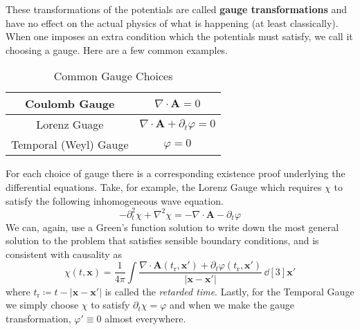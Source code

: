 These transformations of the potentials are called \textbf{gauge transformations}
and have no effect on the actual physics of what is happening (at least
classically). When one imposes an extra condition which the potentials must
satisfy, we call it choosing a gauge. Here are a few common examples.
\begin{table}[H]
    \centering
    \begin{tabular}{c c}
        Coulomb Gauge         & \(\nabla\cdot\mathbf{A} = 0\)                     \\ \midrule
        Lorenz Guage          & \(\nabla\cdot\mathbf{A} + \partial_t\varphi = 0\) \\ \midrule
        Temporal (Weyl) Gauge & \(\varphi = 0\)
    \end{tabular}
    \caption{Common Gauge Choices}\label{table:gauges}
\end{table}
For each choice of gauge there is a corresponding existence proof underlying the
differential equations. Take, for example, the Lorenz Gauge which requires
\(\chi\) to satisfy the following inhomogeneous wave equation.
\begin{equation*}
    -\partial_t^2\chi + \nabla^2\chi = -\nabla\cdot\mathbf{A} - \partial_t\varphi
\end{equation*}
We can, again, use a Green's function solution to write down the most general
solution to the problem that satisfies sensible boundary conditions, and is
consistent with causality as
\begin{equation*}
    \chi(t,\mathbf{x}) = \frac{1}{4\pi}\int \frac{\nabla\cdot\mathbf{A}(t_\text{r},\mathbf{x}') + \partial_t\varphi(t_\text{r},\mathbf{x}')}{\left|\mathbf{x} - \mathbf{x}'\right|}\,\dd[3]{\mathbf{x}'}
\end{equation*}
where \(t_\text{r}\coloneqq t - \left|\mathbf{x} - \mathbf{x}'\right|\) is
called the \textit{retarded time}.
Lastly, for the Temporal Gauge we simply choose \(\chi\) to satisfy
\(\partial_t\chi = \varphi\) and when we make the gauge transformation,
\(\varphi'\equiv 0\) almost everywhere.

